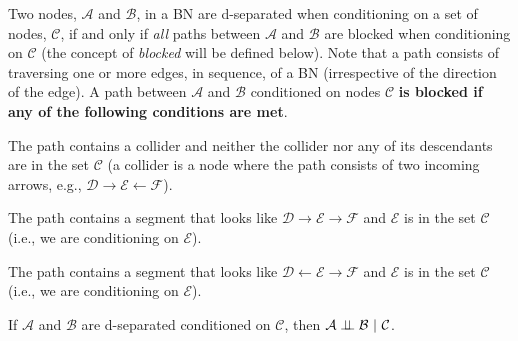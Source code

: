 \documentclass{tufte-handout}
\begin{document}
\begin{recall}
Two nodes, $\mathcal{A}$ and $\mathcal{B}$, in a BN are d-separated when conditioning on a set of nodes, $\mathcal{C}$, if and only if \emph{all} paths between  $\mathcal{A}$ and $\mathcal{B}$ are blocked when conditioning on $\mathcal{C}$ (the concept of \emph{blocked} will be defined below).  Note that a path consists of traversing one or more edges, in sequence, of a BN (irrespective of the direction of the edge).  A path between $\mathcal{A}$ and $\mathcal{B}$ conditioned on nodes $\mathcal{C}$ \textbf{is blocked if any of the following conditions are met}.
\be
\item The path contains a collider and neither the collider nor any of its descendants are in the set $\mathcal{C}$ (a collider is a node where the path consists of two incoming arrows, e.g., $\mathcal{D} \rightarrow \mathcal{E} \leftarrow \mathcal{F}$).
\item The path contains a segment that looks like $\mathcal{D} \rightarrow \mathcal{E} \rightarrow \mathcal{F}$ and $\mathcal{E}$ is in the set $\mathcal{C}$ (i.e., we are conditioning on $\mathcal{E}$).
\item The path contains a segment that looks like $\mathcal{D} \leftarrow \mathcal{E} \rightarrow \mathcal{F}$ and $\mathcal{E}$ is in the set $\mathcal{C}$ (i.e., we are conditioning on $\mathcal{E}$).
\ee


\vspace{1em}
\noindent If $\mathcal{A}$ and $\mathcal{B}$ are d-separated conditioned on $\mathcal{C}$, then $\mathcal{A} \perp\!\!\!\perp \mathcal{B}~|~\mathcal{C}$.

\end{recall}
\end{document}

